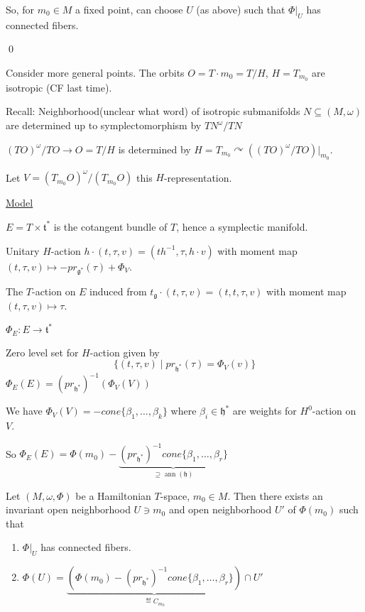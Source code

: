 \documentclass[x11names,reqno,14pt]{extarticle}
\newcommand{\mk}[1]{\mathfrak{#1}}
\newcommand{\g}{\mk{g}}
\newcommand{\h}{\mk{h}}
\renewcommand{\t}{\mk{t}}
\DeclareMathOperator{\ann}{ann}
\begin{document}
So, for $m_0 \in M$ a fixed point, can choose $U$ (as above) such that $\Phi|_U$ has connected fibers. 

\qed

Consider more general points. The orbits $O = T\cdot m_0 = T/H$, $H = T_{m_0}$ are isotropic (CF last time). 

Recall: Neighborhood(unclear what word) of isotropic submanifolds $N \subseteq (M,\omega)$ are determined up to symplectomorphism by $TN^\omega/TN$

$(TO)^\omega/TO \to O = T/H$ is determined by $H = T_{m_0}\curvearrowright ((TO)^\omega/TO)|_{m_0}$. 

Let $V = (T_{m_0}O)^\omega/(T_{m_0}O)$ this $H$-representation. 

\underline{\underline{Model}}

$E = T\times\t^*$ is the cotangent bundle of $T$,  hence a symplectic manifold.

Unitary $H$-action $h\cdot(t,\tau,v) = (th^{-1},\tau,h\cdot v)$ with moment map $(t,\tau,v) \mapsto -pr_{\g^*}(\tau) + \Phi_V$. 

The $T$-action on $E$ induced from $t_\g\cdot(t,\tau,v) = (t,t,\tau,v)$ with moment map $(t,\tau,v)\mapsto\tau$.

$\Phi_E:E\to\t^*$

Zero level set for $H$-action given by 
\[
\{(t,\tau,v) \mid pr_{\h^*}(\tau) = \Phi_V(v)\}
\]
$\Phi_E(E) = (pr_{\h^*})^{-1}(\Phi_V(V))$

We have $\Phi_V(V) = -cone\{\beta_1,\dots,\beta_k\}$ where $\beta_i\in\h^*$ are weights for $H^0$-action on $V$.

So $\Phi_E(E) = \Phi(m_0) - \underbrace{(pr_{\h^*})^{-1}cone\{\beta_1,\dots,\beta_r\}}_{\supseteq\ann(\h)}$


Let $(M,\omega,\Phi)$ be a Hamiltonian $T$-space, $m_0\in M$. Then there exists an invariant open neighborhood $U \ni m_0$ and open neighborhood $U'$ of $\Phi(m_0)$ such that 
\begin{enumerate}

\item $\Phi|_U$ has connected fibers. 

\item $\Phi(U) = \underbrace{(\Phi(m_0) - (pr_{\h^*})^{-1}cone\{\beta_1,\dots,\beta_r\})}_{\eqdef C_{m_0}}\cap U'$

\end{enumerate}
\end{document}
